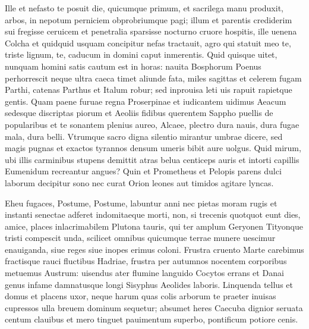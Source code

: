 \documentclass{book}
\newenvironment {carmen} [1] [\relax] 
  {\Titulus \Versus \incipit*\numerus{1}#1}
  {\endVersus}
\newcommand {\Alcaic}    {\Forma \strophae {0 \poena 01 \poena 2}}
\begin{document}
\begin{carmen}[\Alcaic]


Ille et nefasto te posuit die,
 quicumque primum, et sacrilega manu
      produxit, arbos, in nepotum
      perniciem obprobriumque pagi; 
illum et parentis crediderim sui               
 fregisse ceruicem et penetralia
      sparsisse nocturno cruore
      hospitis, ille uenena Colcha 
et quidquid usquam concipitur nefas
 tractauit, agro qui statuit meo               
      te, triste lignum, te, caducum
      in domini caput inmerentis. 
Quid quisque uitet, nunquam homini satis
 cautum est in horas: nauita Bosphorum
      Poenus perhorrescit neque ultra               
      caeca timet aliunde fata, 
miles sagittas et celerem fugam
 Parthi, catenas Parthus et Italum
      robur; sed inprouisa leti
      uis rapuit rapietque gentis.                
Quam paene furuae regna Proserpinae
 et iudicantem uidimus Aeacum
      sedesque discriptas piorum et
      Aeoliis fidibus querentem 
Sappho puellis de popularibus                
et te sonantem plenius aureo,
      Alcaee, plectro dura nauis,
      dura fugae mala, dura belli. 
Vtrumque sacro digna silentio
 mirantur umbrae dicere, sed magis               
      pugnas et exactos tyrannos
      densum umeris bibit aure uolgus. 
Quid mirum, ubi illis carminibus stupens
 demittit atras belua centiceps
      auris et intorti capillis               
      Eumenidum recreantur angues? 
Quin et Prometheus et Pelopis parens
 dulci laborum decipitur sono
      nec curat Orion leones
      aut timidos agitare lyncas.                

\end{carmen}

\begin{carmen}[\Alcaic]


Eheu fugaces, Postume, Postume,
 labuntur anni nec pietas moram
      rugis et instanti senectae
      adferet indomitaeque morti, 
non, si trecenis quotquot eunt dies,                
amice, places inlacrimabilem
      Plutona tauris, qui ter amplum
      Geryonen Tityonque tristi 
compescit unda, scilicet omnibus
 quicumque terrae munere uescimur               
      enauiganda, siue reges
      siue inopes erimus coloni. 
Frustra cruento Marte carebimus
 fractisque rauci fluctibus Hadriae,
      frustra per autumnos nocentem               
      corporibus metuemus Austrum: 
uisendus ater flumine languido
 Cocytos errans et Danai genus
      infame damnatusque longi
      Sisyphus Aeolides laboris.                
Linquenda tellus et domus et placens
 uxor, neque harum quas colis arborum
      te praeter inuisas cupressos
      ulla breuem dominum sequetur; 
absumet heres Caecuba dignior                
seruata centum clauibus et mero
      tinguet pauimentum superbo,
      pontificum potiore cenis. 

\end{carmen}
\end{document}
